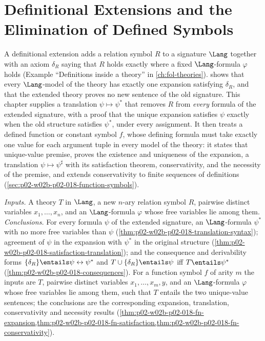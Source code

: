 \chapter{Definitional Extensions and the Elimination of Defined Symbols}
\label{sec:p02-w02b-p02-018-defined-relation-elimination}

A definitional extension adds a relation symbol \(R\) to a signature
\(\Lang\) together with an axiom \(\delta_R\) saying that \(R\) holds exactly
where a fixed \(\Lang\)-formula \(\varphi\) holds (Example ``Definitions
inside a theory'' in \cref{ch:fol-theories}).
 shows that every \(\Lang\)-model of
the theory has exactly one expansion satisfying \(\delta_R\), and that the
extended theory proves no new sentence of the old signature.  This chapter
supplies a translation \(\psi\mapsto\psi^{*}\) that removes \(R\) from
\emph{every} formula of the extended signature, with a proof that the
unique expansion satisfies \(\psi\) exactly when the old structure
satisfies \(\psi^{*}\), under every assignment.  It then treats a defined
function or constant symbol \(f\), whose defining formula must take
exactly one value for each argument tuple in every model of the theory:
it states that unique-value premise, proves the existence and uniqueness of
the expansion, a translation \(\psi\mapsto\psi^{\sharp}\) with its
satisfaction theorem, conservativity, and the necessity of the premise, and
extends conservativity to finite sequences of definitions
(\cref{sec:p02-w02b-p02-018-function-symbols}).

\emph{Inputs.}  A theory \(T\) in \(\Lang\), a new \(n\)-ary relation symbol
\(R\), pairwise distinct variables \(x_1,\ldots,x_n\), and an
\(\Lang\)-formula \(\varphi\) whose free variables lie among them.
\emph{Conclusions.}  For every formula \(\psi\) of the extended signature,
an \(\Lang\)-formula \(\psi^{*}\) with no more free variables than \(\psi\)
(\cref{thm:p02-w02b-p02-018-translation-syntax}); agreement of \(\psi\) in
the expansion with \(\psi^{*}\) in the original structure
(\cref{thm:p02-w02b-p02-018-satisfaction-translation}); and the consequence
and derivability forms \(\{\delta_R\}\entails\psi\leftrightarrow\psi^{*}\)
and \(T\cup\{\delta_R\}\entails\psi\) iff \(T\entails\psi^{*}\)
(\cref{thm:p02-w02b-p02-018-consequences}).  For a function symbol \(f\) of
arity \(m\) the inputs are \(T\), pairwise distinct variables
\(x_1,\ldots,x_m,y\), and an \(\Lang\)-formula \(\varphi\) whose free
variables lie among them, such that \(T\) entails the two unique-value
sentences; the conclusions are the corresponding expansion, translation,
conservativity and necessity results
(\cref{thm:p02-w02b-p02-018-fn-expansion,thm:p02-w02b-p02-018-fn-satisfaction,thm:p02-w02b-p02-018-fn-conservativity}).

